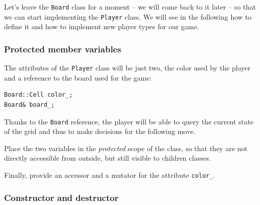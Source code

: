 \documentclass{article}
\begin{document}
Let's leave the \texttt{Board} class for a moment -- we will come back to it later -- so that we can start implementing the \texttt{Player} class. We will see in the following how to define it and how to implement new player types for our game.


\subsubsection{Protected member variables}

The attributes of the \texttt{Player} class will be just two, the color used by the player and a reference to the board used for the game:
\begin{center}
\begin{minipage}{.9\textwidth}
\begin{lstlisting}[style=mycpp,numbers=none]
Board::Cell color_;
Board& board_;
\end{lstlisting}
\end{minipage}
\end{center}
Thanks to the \texttt{Board} reference, the player will be able to query the current state of the grid and thus to make decisions for the following move.

Place the two variables in the \emph{protected} scope of the class, so that they are not directly accessible from outside, but still visible to children classes.

Finally, provide an accessor and a mutator for the attribute \texttt{color\string_}.


\subsubsection{Constructor and destructor}
\end{document}
